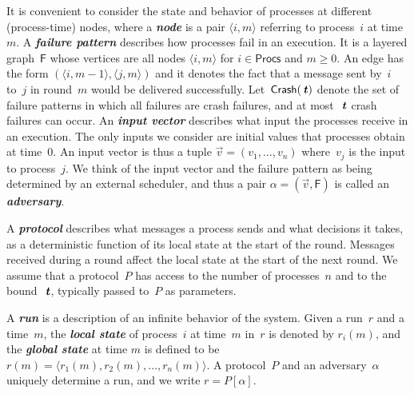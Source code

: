 \documentclass[11pt]{article}
\theoremstyle{definition}
\newcommand{\Crash}{\mathsf{Crash}}
\newcommand{\defemph}[1]{\textbf{\textit{#1}}}
\newcommand{\Proc}{\mathsf{Procs}}
\newcommand{\tee}{\,\defemph{t}}
\newcommand{\FP}{\mathsf{F}}
\newcommand{\node}[1]{\langle#1\rangle}
\begin{document}
It is convenient to consider the state and behavior of processes at different (process-time) nodes, where a \defemph{node}  is a pair $\node{i,m}$ referring to process~$i$ at time~$m$.
A \defemph{failure pattern} describes how processes fail in an execution.
It is a layered graph~$\FP$ whose vertices are
all nodes
$\node{i,m}$ for $i\in\Proc$ and $m\ge 0$.
An edge has the form $(\node{i,m-1},\node{j,m})$
and it denotes the fact that a message sent by~$i$ to~$j$ in round~$m$ would be delivered successfully.
Let~$\Crash(\tee)$ denote the set of failure patterns in which
all failures are crash failures, and
at most~$\tee$ crash failures can occur.
An \defemph{input vector} describes what input the processes receive in an
execution. The only inputs we consider are initial values that processes obtain at time~0.
An input vector is thus a tuple $\vec{v}=(v_1,\ldots,v_n)$ where~$v_j$ is the input to process~$j$.
We think of the input vector and the failure pattern as being determined by an external scheduler, and thus a  pair $\alpha=(\vec{v},\FP)$ is called an
\defemph{adversary}.

A \defemph{protocol} describes what messages a process sends and what decisions it takes,
as a deterministic function
 of its local state at the start of the round.  Messages received during a round affect the local state at  the start of the next round.
We assume that a protocol~$P$ has access to the number of processes~$n$ and to the bound~$\tee$,
typically passed to~$P$ as parameters.

A \defemph{run} is a description of an infinite behavior of the system.
Given a run~$r$ and a time~$m$,
the \defemph{local state} of process~$i$ at time~$m$ in~$r$
is denoted by $r_i(m)$,
and the \defemph{global state} at time $m$
is defined to be $r(m)=\node{r_1(m),r_2(m),\ldots,r_n(m)}$.
A protocol~$P$ and an adversary~$\alpha$ uniquely determine a run,
and we write $r = P[\alpha]$.
\end{document}
